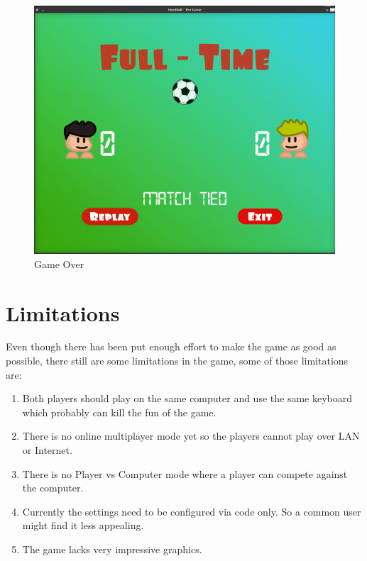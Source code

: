 \documentclass[main]{subfiles}
\begin{document}
\begin{figure}[H]
    \centering
    \includegraphics[scale=0.44]{graphics/state_screenshots/gameOver_state}
    \caption{Game Over}
    \label{fig:gameOver_state}
\end{figure}

\newpage

\section{Limitations}
Even though there has been put enough effort to make the game as good as possible, there still are some limitations in the game, some of those limitations are: 
\begin{enumerate}
    \item Both players should play on the same computer and use the same keyboard which probably can kill the fun of the game.
    
    \item There is no online multiplayer mode yet so the players cannot play over LAN or Internet.
    
    \item There is no Player vs Computer mode where a player can compete against the computer. 
    
    \item Currently the settings need to be configured via code only. So a common user might find it less appealing.
    
    \item The game lacks very impressive graphics.
\end{enumerate}
\end{document}
